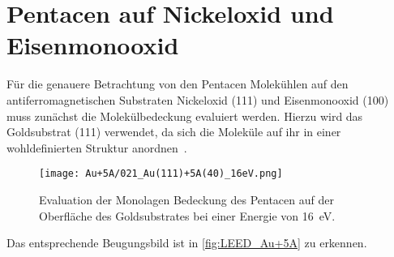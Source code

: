     \section{Pentacen auf Nickeloxid und Eisenmonooxid} \label{sec:Ergeb}
        Für die genauere Betrachtung von den Pentacen Molekühlen auf den antiferromagnetischen Substraten Nickeloxid (111) und Eisenmonooxid (100) muss zunächst die Molekülbedeckung evaluiert werden.
        Hierzu wird das Goldsubstrat (111) verwendet, da sich die Moleküle auf ihr in einer wohldefinierten Struktur anordnen~\cite{5A_4}.
        \begin{figure}
            \centering
            \texttt{[image: Au+5A/021\_Au(111)+5A(40)\_16eV.png]}
            \caption{Evaluation der Monolagen Bedeckung des Pentacen auf der Oberfläche des Goldsubstrates bei einer Energie von \SI{16}{\electronvolt}.}
            \label{fig:LEED_Au+5A}
        \end{figure}
        Das entsprechende Beugungsbild ist in \autoref{fig:LEED_Au+5A} zu erkennen.
    
